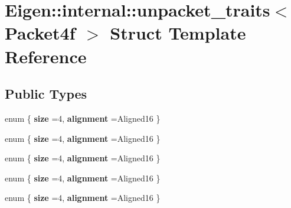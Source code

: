 \hypertarget{struct_eigen_1_1internal_1_1unpacket__traits_3_01_packet4f_01_4}{}\section{Eigen\+:\+:internal\+:\+:unpacket\+\_\+traits$<$ Packet4f $>$ Struct Template Reference}
\label{struct_eigen_1_1internal_1_1unpacket__traits_3_01_packet4f_01_4}
\subsection*{Public Types}
\begin{DoxyCompactItemize}
\item 
\mbox{\label{struct_eigen_1_1internal_1_1unpacket__traits_3_01_packet4f_01_4_a84804ad8850c0943b6b17e79cce8001b}} 
enum \{ {\bfseries size} =4, 
{\bfseries alignment} =Aligned16
 \}
\item 
\mbox{\label{struct_eigen_1_1internal_1_1unpacket__traits_3_01_packet4f_01_4_af4c307933f2dec146bf052866816d149}} 
enum \{ {\bfseries size} =4, 
{\bfseries alignment} =Aligned16
 \}
\item 
\mbox{\label{struct_eigen_1_1internal_1_1unpacket__traits_3_01_packet4f_01_4_af8db03dad39619b85f8f68f2f2ee0afd}} 
enum \{ {\bfseries size} =4, 
{\bfseries alignment} =Aligned16
 \}
\item 
\mbox{\label{struct_eigen_1_1internal_1_1unpacket__traits_3_01_packet4f_01_4_afe4b2aad149e92f34882a449129f60db}} 
enum \{ {\bfseries size} =4, 
{\bfseries alignment} =Aligned16
 \}
\item 
\mbox{\label{struct_eigen_1_1internal_1_1unpacket__traits_3_01_packet4f_01_4_adc1760816341babe11d254a11c5e9c35}} 
enum \{ {\bfseries size} =4, 
{\bfseries alignment} =Aligned16
 \}
\item 
\mbox{\label{struct_eigen_1_1internal_1_1unpacket__traits_3_01_packet4f_01_4_a22a78d75ba77968e5262e8c61e3b152e}} 

\end{DoxyCompactItemize}
